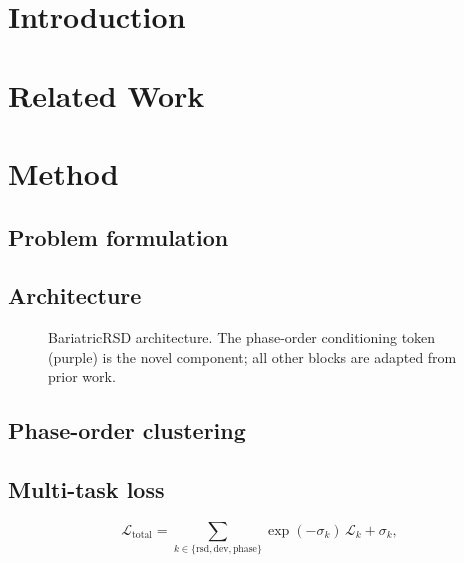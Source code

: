 \section{Introduction}

\section{Related Work}

\section{Method}
\label{sec:method}

\subsection{Problem formulation}

\subsection{Architecture}
\begin{figure}[t]
  \centering
  \caption{BariatricRSD architecture. The phase-order conditioning token (purple) is the novel
    component; all other blocks are adapted from prior work.}
  \label{fig:architecture}
\end{figure}

\subsection{Phase-order clustering}

\subsection{Multi-task loss}
\begin{equation}
  \mathcal{L}_{\text{total}} = \sum_{k \in \{\text{rsd}, \text{dev}, \text{phase}\}}
    \exp(-\sigma_k)\,\mathcal{L}_k + \sigma_k,
\end{equation}

